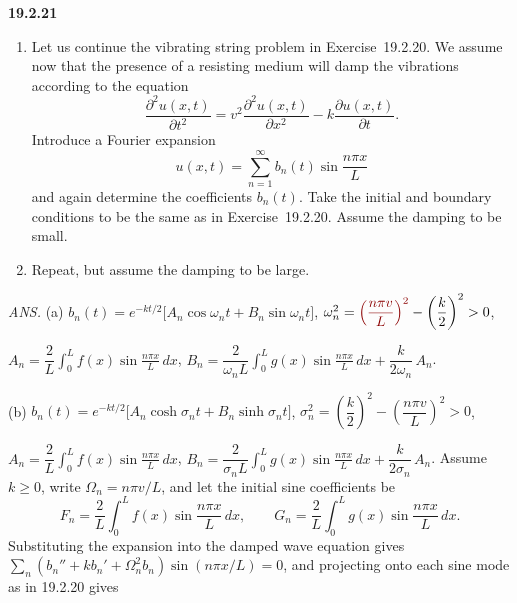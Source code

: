 \par\bigskip
\noindent\textbf{19.2.21}
\begin{enumerate}
\item[(a)] Let us continue the vibrating string problem in
Exercise~19.2.20. We assume now that the presence of a resisting
medium will damp the vibrations according to the equation
\[
\frac{\partial^{2}u(x,t)}{\partial t^{2}}
=v^{2}\frac{\partial^{2}u(x,t)}{\partial x^{2}}
-k\frac{\partial u(x,t)}{\partial t}.
\]
Introduce a Fourier expansion
\[
u(x,t)=\sum_{n=1}^{\infty}b_{n}(t)\sin\frac{n\pi x}{L}
\]
and again determine the coefficients $b_{n}(t)$. Take the initial
and boundary conditions to be the same as in Exercise~19.2.20.
Assume the damping to be small.
\item[(b)] Repeat, but assume the damping to be large.
\end{enumerate}
\par\nobreak\hfill\emph{ANS.}\enspace
(a) $b_{n}(t)=e^{-kt/2}\big[A_{n}\cos\omega_{n}t
+B_{n}\sin\omega_{n}t\big]$,\quad
$\omega_{n}^{2}=\erratum{\left(\dfrac{n\pi v}{L}\right)^{2}}
-\left(\dfrac{k}{2}\right)^{2}>0$,\par\nobreak
\hfill$A_{n}=\dfrac{2}{L}\displaystyle\int_{0}^{L}
f(x)\sin\frac{n\pi x}{L}\,dx$,\quad
$B_{n}=\dfrac{2}{\omega_{n}L}\displaystyle\int_{0}^{L}
g(x)\sin\frac{n\pi x}{L}\,dx+\dfrac{k}{2\omega_{n}}\,A_{n}$.\par
\nobreak\hfill
(b) $b_{n}(t)=e^{-kt/2}\big[A_{n}\cosh\sigma_{n}t
+B_{n}\sinh\sigma_{n}t\big]$,\quad
$\sigma_{n}^{2}=\left(\dfrac{k}{2}\right)^{2}
-\left(\dfrac{n\pi v}{L}\right)^{2}>0$,\par\nobreak
\hfill$A_{n}=\dfrac{2}{L}\displaystyle\int_{0}^{L}
f(x)\sin\frac{n\pi x}{L}\,dx$,\quad
$B_{n}=\dfrac{2}{\sigma_{n}L}\displaystyle\int_{0}^{L}
g(x)\sin\frac{n\pi x}{L}\,dx+\dfrac{k}{2\sigma_{n}}\,A_{n}$.
\solution
Assume $k\ge0$, write $\Omega_n=n\pi v/L$, and let the initial sine coefficients be
\[
F_n=\frac2L\int_0^Lf(x)\sin\frac{n\pi x}{L}\,dx,
\qquad G_n=\frac2L\int_0^Lg(x)\sin\frac{n\pi x}{L}\,dx.
\]
Substituting the expansion into the damped wave equation gives
$\sum_n(b_n''+kb_n'+\Omega_n^2b_n)\sin(n\pi x/L)=0$, and projecting
onto each sine mode as in 19.2.20 gives
